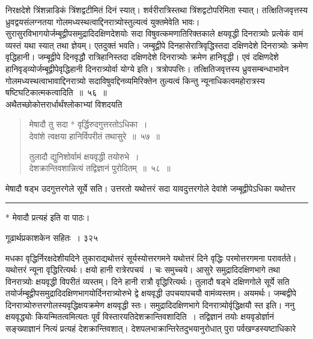 \documentclass[11pt, openany]{book}
\begin{document}
\noindent निरक्षदेशे त्रिंशन्नाडिकं त्रिंशद्वटीमितं दिनं स्यात्। शर्वरीरात्रिस्तथा त्रिंशद्वटोपरिमिता स्यात्। तत्क्षितिजवृत्तस्य
ध्रुवद्वयसंलग्नतया गोलमध्यस्थत्वाद्दिनरात्र्योस्तुल्यत्वं युक्तमेवेति भावः।सुरासुरविभागयोर्जम्बूद्वीपसमुद्रादिदक्षिणदेशयोः सदा विषुवत्कमणातिरिक्तकाले क्षयवृद्धी दिनरात्र्योः प्रत्येकं वामं व्यस्तं यथा स्यात् तथा ज्ञेयम्। एतदुक्तं भवति। जम्बूद्वीपे दिनहासेरात्रिवृद्धिस्तदा दक्षिणदेशे दिनरात्र्योः क्रमेण वृद्धिहानी। जम्बूद्वीपे दिनवृद्धौ रात्रिहानिस्तदा दक्षिणदेशे दिनरात्र्योः क्रमेण हानिवृद्धी। एवं दक्षिणदेशे हानिवृड्व्योर्जम्बूद्वीपेवृद्धिहानी दिनरात्र्योर्वा योग्ये इति। त्रत्रोपपत्तिः। तत्क्षितिजवृत्तस्य ध्रुवसम्बन्धाभावेन गोलमध्यस्थत्वाभावाद्दिनरात्र्यो सदाविषुवद्दिनव्यमिरिक्तेन तुल्यत्वं किन्तु न्यूनाधिकत्वमहोरात्रस्य षष्टिघटिकात्मकत्वादिति~॥~५६~॥ \\
\noindent अथैतच्छोकोत्तरार्धार्थंश्लोकाभ्यां विशदयति \textendash


\begin{quote}
{\ssi मेषादौ तु सदा * वृर्द्धिरुदगुत्तरतोऽधिका~।\\
देवांशे त्वक्षया हानिर्विपरीतं तथासुरे~॥~५७~॥

तुलादौ द्युनिशोर्वामं क्षयवृद्धी तयोरुभे~।\\
देशक्रान्तिवशान्नित्यं तद्विज्ञानं पुरोदितम्~॥~५८~॥}
\end{quote}
 मेषादौ षड्भ उदगुत्तरगेले सूर्ये सति। उत्तरतो यथोत्तरं सदा यावदुत्तरगोले देवांशे जम्बूद्वीपेऽधिका यथोत्तर \textendash


\noindent\rule{\linewidth}{.5pt}

\begin{center}
  * मेवादौ प्रत्यहं इति वा पाठः।
\end{center}

\newpage


\hspace{3cm} गूढार्थप्रकाशकेन सहितः~।  \hfill ३२५ 
\vspace{1cm}


मधका वृद्धिर्निरक्षदेशीयदिने तुकाराद्यथोत्तरं सूर्यस्योत्तरगमने यथोत्तरं दिने वृद्धिः परमोत्तरगमना परावर्तते। यथोत्तरं न्यूना वृद्धिरित्यर्थः। क्षयो हानी रात्रेरपचयं । चः समुच्चये। आसुरे समुद्रादिदक्षिणभागे तथा विनरात्र्योः क्षयवृद्धी विपरीतं व्यस्तम्। दिने हानी रात्रौ वृद्धिरित्यर्थः। तुलादौ षड्भे दक्षिणगोले सूर्ये सति तयोर्जम्बूद्वीपसमुद्रादिदक्षिणभागयोर्दिनरात्र्योरुभे द्वे क्षयवृद्धी उपचयापचयौ वामंव्यस्तम। अयमर्थः। जम्बद्वीपे दिनरात्र्योरुत्तरगोलस्यवृद्धिक्षयक्रमेण क्षयवृद्धी स्तः। समुद्रादिदक्षिणभागे दिनरात्र्योर्वृद्धिक्षयौ स्त इति। ननु क्षयवृद्ध्योः कियन्मितत्वमित्यतः पूर्वं विस्तारयति\textendash देशक्रान्तिवशादिति~। तद्विज्ञानं तयोः क्षयवृडोर्ज्ञानं सङ्ख्याज्ञानं नित्यं प्रत्यहं देशक्रान्तिवशात्। देशपलभाक्रान्तिरेतदुभयानुरोधात् पुरा पर्वखण्डस्यष्टाधिकारे \textendash
\end{document}
